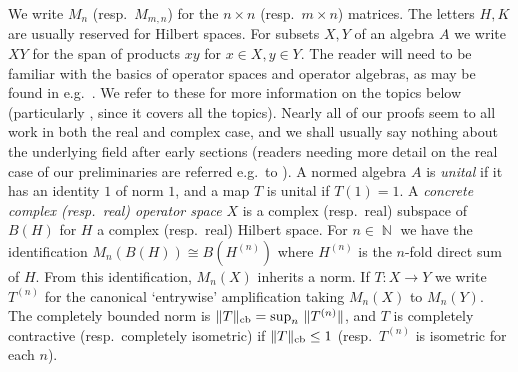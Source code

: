 \documentclass{amsart}
\theoremstyle{remark}
\theoremstyle{definition}
\numberwithin{equation}{section}
\DeclareMathOperator{\bN}{{\mathbb N}}
\begin{document}
 We write $M_n$ (resp.\ $M_{m,n}$) for the  $n \times n$ (resp.\ $m \times n$) matrices.  
 The letters $H, K$ are usually reserved for Hilbert spaces.  
 For subsets $X, Y$ of an algebra $A$ we write $XY$ for the span of products $xy$ for $x \in X, y \in Y$.  The reader will need to be familiar with the  basics of  operator spaces and operator algebras,  
as may be found in  e.g.\ \cite{BLM,Pau,P,Dav}.  We refer to these 
 for more information on the topics below  (particularly \cite{BLM}, since it covers all the topics).  
 Nearly all of our proofs  
 seem to all work in both the real and complex case, and we shall 
 usually say nothing about the underlying field after early sections (readers needing more detail on the real case of our preliminaries are referred e.g.\ to \cite{BReal}). 
A  normed algebra $A$  is {\em unital} if it has an identity $1$ of norm $1$, 
and a map $T$ 
is unital if $T(1) = 1$.  
A {\em concrete complex (resp.\ real) operator space} $X$ is a complex (resp.\ real)  subspace of $B(H)$ for $H$ a complex (resp.\ real) Hilbert space. For $n \in \bN$ we have the identification $M_n(B(H)) \cong B(H^{(n)})$ where $H^{(n)}$ is the $n$-fold direct sum of $H$. From this identification, $M_n(X)$ inherits a norm. 
If $T : X \to Y$ we write $T^{(n)}$ for the canonical `entrywise' amplification taking $M_n(X)$ to $M_n(Y)$.   
The completely bounded norm is $\| T \|_{\rm cb} = \sup_n \, \| T^{(n)} \|$, and $T$ is 
completely  contractive (resp.\
completely isometric) if  $\| T \|_{\rm cb}  \leq 1$ (resp.\ $T^{(n)}$ is isometric for each $n$). 
\end{document}
